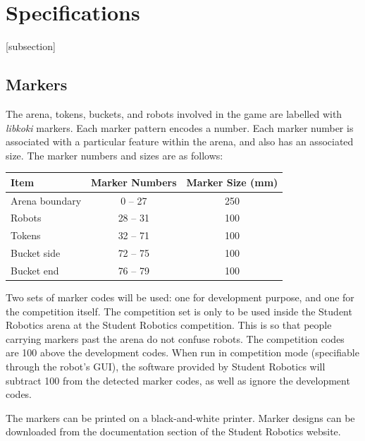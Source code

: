 \section{Specifications}
\label{sec:Specifications}

[subsection]
\newcommand{\rcnii}{\stepcounter{rulei}\arabic{section}.\arabic{subsection}.\arabic{rulei}}
\renewcommand{\labelenumi}{\rcnii}

\subsection{Markers}
\label{sub:markers}
The arena, tokens, buckets, and robots involved in the game are labelled with \textit{libkoki} markers.  Each marker pattern encodes a number.  Each marker number is associated with a particular feature within the arena, and also has an associated size.  The marker numbers and sizes are as follows:

\begin{center}
  \begin{tabular}{lcc}
    \toprule
    \textbf{Item} & \textbf{Marker Numbers} & \textbf{Marker Size (mm)} \\
    \midrule
    Arena boundary & 0 -- 27 & 250 \\
    Robots & 28 -- 31 & 100 \\
    Tokens & 32 -- 71 & 100 \\
    Bucket side & 72 -- 75 & 100 \\
    Bucket end & 76 -- 79 & 100 \\
    \bottomrule
  \end{tabular}
\end{center}

Two sets of marker codes will be used: one for development purpose, and one for the competition itself.  The competition set is only to be used inside the Student Robotics arena at the Student Robotics competition.  This is so that people carrying markers past the arena do not confuse robots.  The competition codes are 100 above the development codes.  When run in competition mode (specifiable through the robot's GUI), the software provided by Student Robotics will subtract 100 from the detected marker codes, as well as ignore the development codes.

The markers can be printed on a black-and-white printer.  Marker designs can be downloaded from the documentation section of the Student Robotics website.


